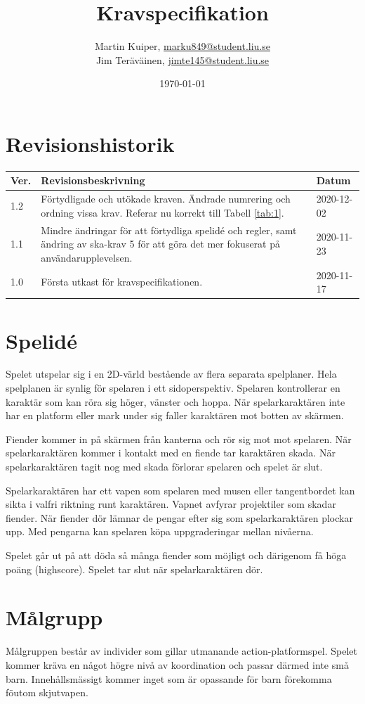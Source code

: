 \documentclass{TDP005mall}
\author{Martin Kuiper, \url{marku849@student.liu.se}\\
  Jim Teräväinen, \url{jimte145@student.liu.se}}
\title{Kravspecifikation}
\date{\today}
\begin{document}
\projectpage
\section{Revisionshistorik}
\begin{table}[!h]
\begin{tabularx}{\linewidth}{|l|X|l|}
\hline
Ver. & Revisionsbeskrivning & Datum \\\hline
1.2 & Förtydligade och utökade kraven. Ändrade numrering och ordning vissa krav. Referar nu korrekt till Tabell \ref{tab:1}. & 2020-12-02 \\\hline
1.1 & Mindre ändringar för att förtydliga spelidé och regler, samt ändring av ska-krav 5 för att göra det mer fokuserat på användarupplevelsen. & 2020-11-23 \\\hline
1.0 & Första utkast för kravspecifikationen. & 2020-11-17 \\\hline
\end{tabularx}
\end{table}


\section{Spelidé}
Spelet utspelar sig i en 2D-värld bestående av flera separata spelplaner. Hela spelplanen är synlig för spelaren i ett sidoperspektiv. Spelaren kontrollerar en karaktär som kan röra sig höger, vänster och hoppa. När spelarkaraktären inte har en platform eller mark under sig faller karaktären mot botten av skärmen.

Fiender kommer in på skärmen från kanterna och rör sig mot mot spelaren. När spelarkaraktären kommer i kontakt med en fiende tar karaktären skada. När spelarkaraktären tagit nog med skada förlorar spelaren och spelet är slut. 

Spelarkaraktären har ett vapen som spelaren med musen eller tangentbordet kan sikta i valfri riktning runt karaktären. Vapnet avfyrar projektiler som skadar fiender.
När fiender dör lämnar de pengar efter sig som spelarkaraktären plockar upp. Med pengarna kan spelaren köpa uppgraderingar mellan nivåerna. 

Spelet går ut på att döda så många fiender som möjligt och därigenom få höga poäng (highscore). Spelet tar slut när spelarkaraktären dör.


\section{Målgrupp}
Målgruppen består av individer som gillar utmanande action-platformspel. Spelet kommer kräva en något högre nivå av koordination och passar därmed inte små barn. Innehållsmässigt kommer inget som är opassande för barn förekomma föutom skjutvapen.
\end{document}
